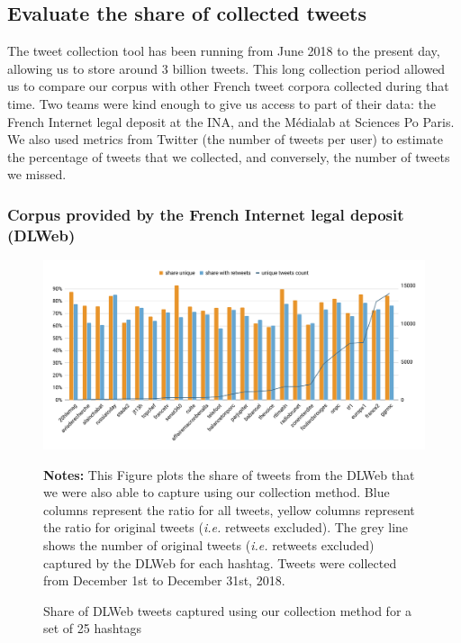 \subsection{Evaluate the share of collected tweets}

The tweet collection tool has been running from June 2018 to the present day, allowing us to store around 3 billion tweets. This long collection period allowed us to compare our corpus with other French tweet corpora collected during that time. Two teams were kind enough to give us access to part of their data: the French Internet legal deposit at the INA, and the Médialab at Sciences Po Paris. We also used metrics from Twitter (the number of tweets per user) to estimate the percentage of tweets that we collected, and conversely, the number of tweets we missed.

\subsubsection{Corpus provided by the French Internet legal deposit (DLWeb)}
\begin{figure}
\begin{center}
\includegraphics[width=1\textwidth]{figures/ShareinCommonWithDL.pdf}
\end{center}
\scriptsize \textbf{Notes:} This Figure plots the share of tweets from the DLWeb that we were also able to capture using our collection method. Blue columns represent the ratio for all tweets, yellow columns represent the ratio for original tweets (\textit{i.e.} retweets excluded). The grey line shows the number of original tweets (\textit{i.e.} retweets excluded) captured by the DLWeb for each hashtag. Tweets were collected from December 1st to December 31st, 2018.

\caption{Share of DLWeb tweets captured using our collection method for a set of 25 hashtags}
\label{Figure:HistogramHashtagsDLWeb}
\end{figure}

